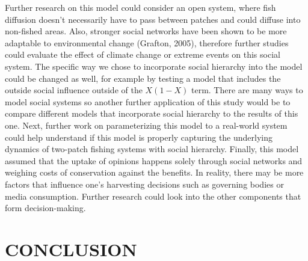 \documentclass[
]{article}
\begin{document}
Further research on this model could consider an open system, where fish diffusion doesn't necessarily have to pass between patches and could diffuse into non-fished areas. Also, stronger social networks have been shown to be more adaptable to environmental change (Grafton, 2005), therefore further studies could evaluate the effect of climate change or extreme events on this social system. The specific way we chose to incorporate social hierarchy into the model could be changed as well, for example by testing a model that includes the outside social influence outside of the \(X(1-X)\) term. There are many ways to model social systems so another further application of this study would be to compare different models that incorporate social hierarchy to the results of this one. Next, further work on parameterizing this model to a real-world system could help understand if this model is properly capturing the underlying dynamics of two-patch fishing systems with social hierarchy. Finally, this model assumed that the uptake of opinions happens solely through social networks and weighing costs of conservation against the benefits. In reality, there may be more factors that influence one's harvesting decisions such as governing bodies or media consumption. Further research could look into the other components that form decision-making.

\newpage

\hypertarget{conclusion}{%
\section{CONCLUSION}\label{conclusion}}
\end{document}
